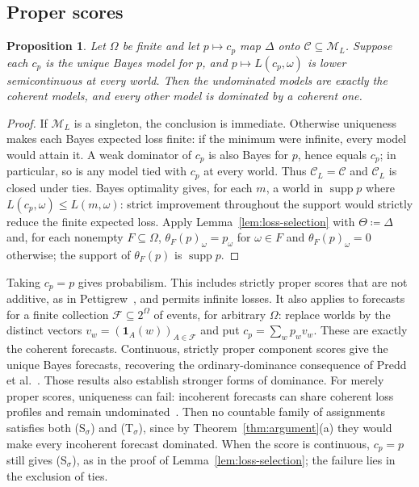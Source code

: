 \documentclass[11pt]{article}
\newtheorem{proposition}[theorem]{Proposition}
\theoremstyle{definition}
\theoremstyle{remark}
\newcommand{\M}{\mathcal M}
\newcommand{\C}{\mathcal C}
\newcommand{\supp}{\operatorname{supp}}
\begin{document}
\subsection{Proper scores}
\begin{proposition}\label{prop:short-proper}
Let $\Omega$ be finite and let $p\mapsto c_p$ map $\Delta$ onto $\C\subseteq\M_L$. Suppose each $c_p$ is the unique Bayes model for $p$, and $p\mapsto L(c_p,\omega)$ is lower semicontinuous at every world. Then the undominated models are exactly the coherent models, and every other model is dominated by a coherent one.
\end{proposition}
\begin{proof}
If $\M_L$ is a singleton, the conclusion is immediate. Otherwise uniqueness makes each Bayes expected loss finite: if the minimum were infinite, every model would attain it. A weak dominator of $c_p$ is also Bayes for $p$, hence equals $c_p$; in particular, so is any model tied with $c_p$ at every world. Thus $\C_L=\C$ and $\C_L$ is closed under ties. Bayes optimality gives, for each $m$, a world in $\supp p$ where $L(c_p,\omega)\le L(m,\omega)$: strict improvement throughout the support would strictly reduce the finite expected loss. Apply Lemma~\ref{lem:loss-selection} with $\Theta\coloneqq\Delta$ and, for each nonempty $F\subseteq\Omega$, $\theta_F(p)_\omega=p_\omega$ for $\omega\in F$ and $\theta_F(p)_\omega=0$ otherwise; the support of $\theta_F(p)$ is $\supp p$.
\end{proof}
Taking $c_p=p$ gives probabilism. This includes strictly proper scores that are not additive, as in Pettigrew~\cite{Pettigrew2022}, and permits infinite losses. It also applies to forecasts for a finite collection $\mathcal F\subseteq2^\Omega$ of events, for arbitrary $\Omega$: replace worlds by the distinct vectors $v_w=(\mathbf1_A(w))_{A\in\mathcal F}$ and put $c_p=\sum_wp_wv_w$. These are exactly the coherent forecasts. Continuous, strictly proper component scores give the unique Bayes forecasts, recovering the ordinary-dominance consequence of Predd et al.~\cite{Predd2009}. Those results also establish stronger forms of dominance. For merely proper scores, uniqueness can fail: incoherent forecasts can share coherent loss profiles and remain undominated~\cite{SSK2009}. Then no countable family of assignments satisfies both (S$_\sigma$) and (T$_\sigma$), since by Theorem~\ref{thm:argument}(a) they would make every incoherent forecast dominated. When the score is continuous, $c_p=p$ still gives (S$_\sigma$), as in the proof of Lemma~\ref{lem:loss-selection}; the failure lies in the exclusion of ties.
\end{document}
